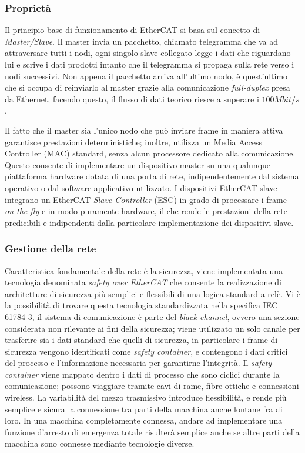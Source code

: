 \subsubsection{Proprietà}
 Il principio base di funzionamento di EtherCAT si basa sul concetto di \textit{Master/Slave}. Il master invia un pacchetto, chiamato telegramma che va ad attraversare tutti i nodi, ogni singolo slave collegato legge i dati che riguardano lui e scrive i dati prodotti intanto che il telegramma si propaga sulla rete verso i nodi successivi. Non appena il pacchetto arriva all'ultimo nodo, è quest'ultimo che si occupa di reinviarlo al master grazie alla comunicazione \textit{full-duplex} presa da Ethernet, facendo questo, il flusso di dati teorico riesce a superare i $100 Mbit/s$. \par Il fatto che il master sia l'unico nodo che può inviare frame in maniera attiva garantisce prestazioni deterministiche; inoltre, utilizza un Media Access Controller (MAC) standard, senza alcun processore dedicato alla comunicazione. Questo consente di implementare un dispositivo master su una qualunque piattaforma hardware dotata di una porta di rete, indipendentemente dal sistema operativo o dal software applicativo utilizzato. I dispositivi EtherCAT slave integrano un EtherCAT \textit{Slave Controller} (ESC) in grado di processare i frame \textit{on-the-fly} e in modo puramente hardware, il che rende le prestazioni della rete predicibili e indipendenti dalla particolare implementazione dei dispositivi slave.
\subsubsection{Gestione della rete}
Caratteristica fondamentale della rete è la sicurezza, viene implementata una tecnologia denominata \textit{safety over EtherCAT} che consente la realizzazione di architetture di sicurezza più semplici e flessibili di una logica standard a relè. Vi è la possibilità di trovare questa tecnologia standardizzata nella specifica IEC 61784-3, il sistema di comunicazione è parte del \textit{black channel}, ovvero una sezione considerata non rilevante ai fini della sicurezza; viene utilizzato un solo canale per trasferire sia i dati standard che quelli di sicurezza, in particolare i frame di sicurezza vengono identificati come \textit{safety container}, e contengono i dati critici del processo e l'informazione necessaria per garantirne l'integrità. Il \textit{safety container} viene mappato dentro i dati di processo che sono ciclici durante la comunicazione; possono viaggiare tramite cavi di rame, fibre ottiche e connessioni wireless. La variabilità del mezzo trasmissivo introduce flessibilità, e rende più semplice e sicura la connessione tra parti della macchina anche lontane fra di loro. In una macchina completamente connessa, andare ad implementare una funzione d'arresto di emergenza totale risulterà semplice anche se altre parti della macchina sono connesse mediante tecnologie diverse. 
